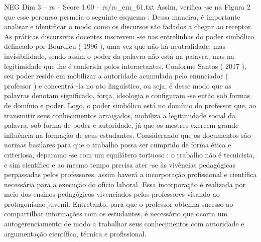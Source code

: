 \begin{textsample}{NEG Dim 3 – rs – Score 1.00 – rs/rs\_em\_61.txt}
Assim, verifica -se na Figura 2 que esse percurso permeia o seguinte esquema : Dessa maneira, é importante analisar e identificar o modo como os discursos são fadados a chegar ao receptor.
As práticas discursivas docentes inscrevem -se nas entrelinhas do poder simbólico delineado por Bourdieu ( 1996 ), uma vez que não há neutralidade, mas invisibilidade, sendo assim o poder da palavra não está na palavra, mas na legitimidade que lhe é conferida pelos interactantes.
Conforme Santos ( 2017 ), seu poder reside em mobilizar a autoridade acumulada pelo enunciador ( professor ) e concentrá -la no ato linguístico, ou seja, é desse modo que as palavras denotam significado, força, ideologia e configuram -se então sob formas de domínio e poder.
Logo, o poder simbólico está no domínio do professor que, ao transmitir seus conhecimentos arraigados, mobiliza a legitimidade social da palavra, sob forma de poder e autoridade, já que os mestres exercem grande influência na formação de seus estudantes.
Considerando que os documentos são normas basilares para que o trabalho possa ser cumprido de forma ética e criteriosa, deparamo -se com um equilátero tortuoso : o trabalho não é tecnicista, e sim científico e ao mesmo tempo precisa ater -se às vivências pedagógicas perpassadas pelos professores, assim haverá a incorporação profissional e científica necessária para a execução do ofício laboral.
Essa incorporação é realizada por meio dos ensinos pedagógicos vivenciados pelos professores visando ao protagonismo juvenil.
Entretanto, para que o professor obtenha sucesso ao compartilhar informações com os estudantes, é necessário que ocorra um autogerenciamento de modo a trabalhar seus conhecimentos com autoridade e argumentação científica, técnica e profissional.

\end{textsample}
